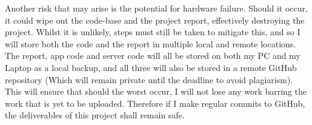 Another risk that may arise is the potential for hardware failure. 
Should it occur, it could wipe out the code-base and the project report, effectively destroying the project. 
Whilst it is unlikely, steps must still be taken to mitigate this, and so I will store both the code and the report in multiple local and remote locations.
The report, app code and server code will all be stored on both my PC and my Laptop as a local backup, and all three will also be stored in a remote GitHub repository (Which will remain private until the deadline to avoid plagiarism).
This will ensure that should the worst occur, I will not lose any work barring the work that is yet to be uploaded.
Therefore if I make regular commits to GitHub, the deliverables of this project shall remain safe. 

